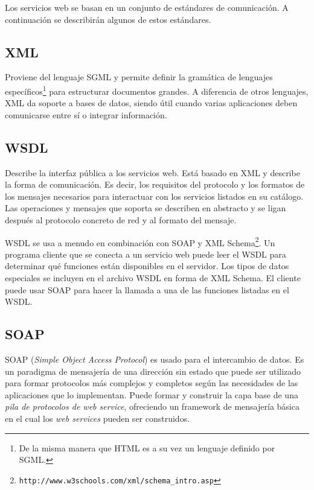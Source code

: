 \documentclass[conference]{IEEEtran}
\begin{document}
Los servicios web se basan en un conjunto de estándares de
comunicación. A continuación se describirán algunos de estos
estándares. 

\subsection{XML}
\label{sec:serv-soa-xml}

Proviene del lenguaje SGML y permite definir la gramática de lenguajes
específicos\footnote{De la misma manera que HTML es a su vez un lenguaje
definido por SGML.} para estructurar documentos grandes. A diferencia
de otros lenguajes, XML da soporte a bases de datos, siendo útil
cuando varias aplicaciones deben comunicarse entre sí o integrar
información.

\subsection{WSDL}
\label{sec:serv-soa-wsdl}

Describe la interfaz pública a los servicios web. Está basado en XML y
describe la forma de comunicación. Es decir, los requisitos del
protocolo y los formatos de los mensajes necesarios para interactuar
con los servicios listados en su catálogo. Las operaciones y mensajes
que soporta se describen en abstracto y se ligan después al protocolo
concreto de red y al formato del mensaje.

WSDL se usa a menudo en combinación con SOAP y XML
Schema\footnote{\texttt{http://www.w3schools.com/xml/schema\_intro.asp}}. Un
programa cliente que se conecta a un servicio web puede leer el WSDL
para determinar qué funciones están disponibles en el servidor. Los
tipos de datos especiales se incluyen en el archivo WSDL en forma de
XML Schema. El cliente puede usar SOAP para hacer la llamada a una de
las funciones listadas en el WSDL.

\subsection{SOAP}
\label{sec:serv-soa-soap}

SOAP (\textsl{Simple Object Access Protocol}) es usado para el
intercambio de datos.
Es un paradigma de mensajería de una dirección sin estado que puede
ser utilizado para formar protocolos más complejos y completos según
las necesidades de las aplicaciones que lo implementan. Puede formar y
construir la capa base de una \emph{pila de protocolos de web service},
ofreciendo un framework de mensajería básica en el cual los \emph{web
services} pueden ser construidos.
\end{document}
